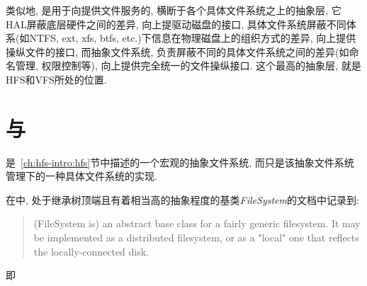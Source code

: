 类似地, \HFS 是用于向\Hadoop 提供文件服务的, 横断于各个具体文件系统之上的抽象层, 它
HAL屏蔽底层硬件之间的差异,
向上提驱动磁盘的接口,
具体文件系统屏蔽不同体系(如NTFS, ext, xfs, btfs, etc.)下信息在物理磁盘上的组织方式的差异,
向上提供操纵文件的接口,
而抽象文件系统,
负责屏蔽不同的具体文件系统之间的差异(如命名管理, 权限控制等),
向上提供完全统一的文件操纵接口. 这个最高的抽象层, 就是HFS和VFS所处的位置.

\section{\HadoopFS 与 \HadoopDFS}

\HadoopFS 是~\ref{ch:hfs-intro:hfs}节中描述的一个宏观的抽象文件系统,
而\HadoopDFS 只是该抽象文件系统管理下的一种具体文件系统的实现.

在\HFS 中, 处于继承树顶端且有着相当高的抽象程度的基类\emph{FileSystem}的文档中记录到:
\begin{quote}
(FileSystem is) an abstract base class for a fairly generic filesystem.  It
may be implemented as a distributed filesystem, or as a "local"
one that reflects the locally-connected disk.
\end{quote}
即
\begin{quote}
\end{quote}
